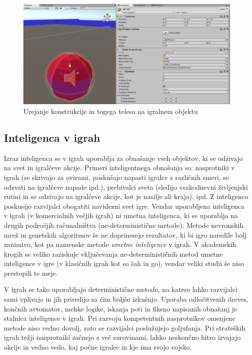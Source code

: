 \documentclass[12pt,a4paper,twoside]{book}
\begin{document}
\begin{figure}[h]
	\centering
	\includegraphics[width=15cm]{unityRigidbody}
	\caption{Urejanje konstrukcije in togega telesa na igralnem objektu}
	\label{slika:unityRigidbody}
\end{figure}

\subsection{Inteligenca v igrah}
Izraz inteligenca se v igrah uporablja za obnašanje vseh objektov, ki se odzivajo na svet in igralčeve akcije. Primeri inteligentnega obnašanja so: nasprotniki v igrah (se skrivajo za ovirami, poskušajo napasti igralce z različnih smeri, se odzvati na igralčeve napade ipd.), prebivalci sveta (sledijo vsakodnevni življenjski rutini in se odzivajo na igralčeve akcije, kot je nasilje ali kraja), ipd. Z inteligenco poskusijo razvijalci obogatiti navidezni svet igre. Vendar uporabljena inteligenca v igrah (v komercialnih večjih igrah) ni umetna inteligenca, ki se uporablja na drugih področjih računalništva (ne-deterministične metode). Metode nevronskih mrež in genetskih algoritmov še ne doprinesejo rezultatov, ki bi igro naredile bolj zanimivo, kot pa namenske metode \textit{umetne inteligence} v igrah. V akademskih krogih se veliko raziskuje vključevanja ne-determinističnih metod umetne inteligence v igre (v klasičnih igrah kot so šah in go), vendar veliki studii še niso prestopili te meje. 

V igrah se tako uporabljajo deterministične metode, na katere lahko razvijalci sami vplivajo in jih priredijo za čim boljšo izkušnjo. Uporaba odločitvenih dreves, končnih avtomatov, mehke logike, iskanja poti in fiksno napisanih obnašanj je stalnica inteligence v igrah. Pri razvoju kompetentnih nasprotnikov omenjene metode niso vedno dovolj, zato se razvijalci poslužujejo goljufanja. Pri strateških igrah težji nasprotniki začnejo z več surovinami, lahko neskončno hitro izvajajo akcije in vedno vedo, kaj počne igralec in kje ima svojo vojsko.
\end{document}
